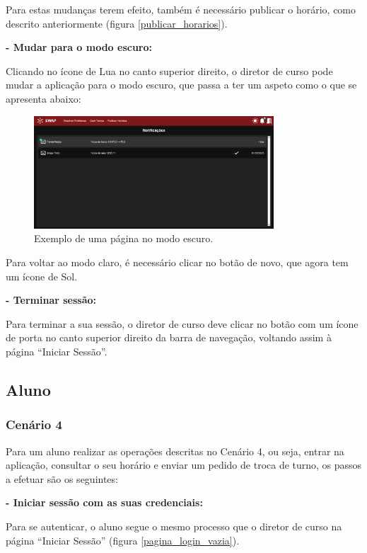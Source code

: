 \documentclass[12pt, a4paper]{article}
\begin{document}
Para estas mudanças terem efeito, também é necessário publicar o horário, como descrito
anteriormente (figura \ref{publicar_horarios}).

\textbf{- Mudar para o modo escuro:}

Clicando no ícone de Lua no canto superior direito, o diretor de curso pode mudar a aplicação
para o modo escuro, que passa a ter um aspeto como o que se apresenta abaixo:

\begin{figure}[H]
    \centering
    \includegraphics[width=0.8\textwidth]{res/manual/modo_escuro_diretor.png}
    \caption{Exemplo de uma página no modo escuro.}
    \label{modo_escuro_diretor}
\end{figure}

Para voltar ao modo claro, é necessário clicar no botão de novo, que agora tem um ícone de Sol.

\textbf{- Terminar sessão:}

Para terminar a sua sessão, o diretor de curso deve clicar no botão com um ícone de porta no canto
superior direito da barra de navegação, voltando assim à página ``Iniciar Sessão''.

\subsection{Aluno}

\subsubsection{Cenário 4}

Para um aluno realizar as operações descritas no Cenário 4, ou seja, entrar na aplicação, consultar
o seu horário e enviar um pedido de troca de turno, os passos a efetuar são os seguintes:

\textbf{- Iniciar sessão com as suas credenciais:}

Para se autenticar, o aluno segue o mesmo processo que o diretor de curso na página
``Iniciar Sessão'' (figura \ref{pagina_login_vazia}).
\end{document}
